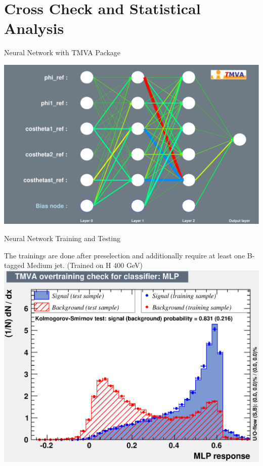 \section{Cross Check and Statistical Analysis}


\begin{frame}{Neural Network with TMVA Package}
\begin{center}
\includegraphics[width=0.8\linewidth]{images/plots/NN/nn_network_architecture}
\end{center}
\end{frame}

\begin{frame}{Neural Network Training and Testing}
\begin{center}
The trainings are done after preselection and additionally require at least one B-tagged Medium jet. (Trained on H 400 GeV)
\includegraphics[width=0.7\linewidth]{images/plots/NN/MLP.eps}
\end{center}
\end{frame}


